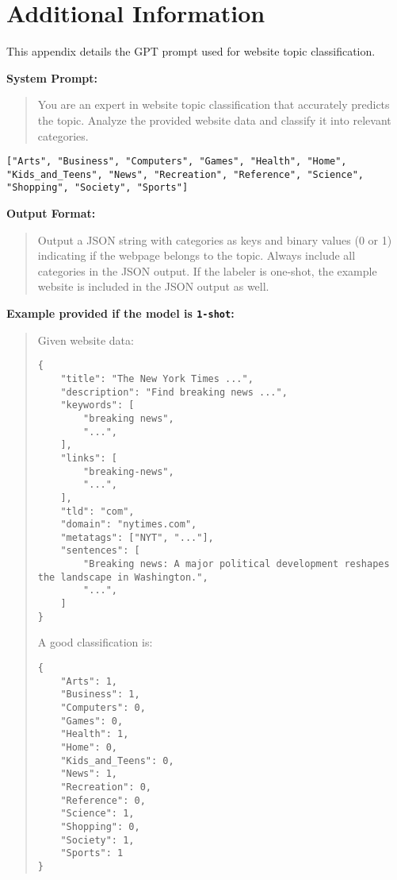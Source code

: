 \section{Additional Information}
\label{app:prompt}
This appendix details the GPT prompt used for website topic classification. 

\textbf{System Prompt:} 
\begin{quote}
    You are an expert in website topic classification that accurately predicts the topic. Analyze the provided website data and classify it into relevant categories.
\end{quote}

\begin{verbatim}
["Arts", "Business", "Computers", "Games", "Health", "Home", 
"Kids_and_Teens", "News", "Recreation", "Reference", "Science", 
"Shopping", "Society", "Sports"]
\end{verbatim}

\textbf{Output Format:}
\begin{quote}
    Output a JSON string with categories as keys and binary values (0 or 1) indicating if the webpage belongs to the topic. Always include all categories in the JSON output. If the labeler is one-shot, the example website is included in the JSON output as well.
\end{quote}

\textbf{Example provided if the model is \texttt{1-shot}:}
\begin{quote}
    Given website data: \\
    \begin{verbatim}
{         
    "title": "The New York Times ...",
    "description": "Find breaking news ...",
    "keywords": [
        "breaking news",
        "...",
    ],
    "links": [
        "breaking-news",
        "...",
    ],
    "tld": "com",
    "domain": "nytimes.com",
    "metatags": ["NYT", "..."],
    "sentences": [
        "Breaking news: A major political development reshapes the landscape in Washington.",
        "...",
    ]
}
        \end{verbatim}
    A good classification is:
    \begin{verbatim}
{
    "Arts": 1,
    "Business": 1,
    "Computers": 0,
    "Games": 0,
    "Health": 1,
    "Home": 0,
    "Kids_and_Teens": 0,
    "News": 1,
    "Recreation": 0,
    "Reference": 0,
    "Science": 1,
    "Shopping": 0,
    "Society": 1,
    "Sports": 1
}
    \end{verbatim}
\end{quote}


